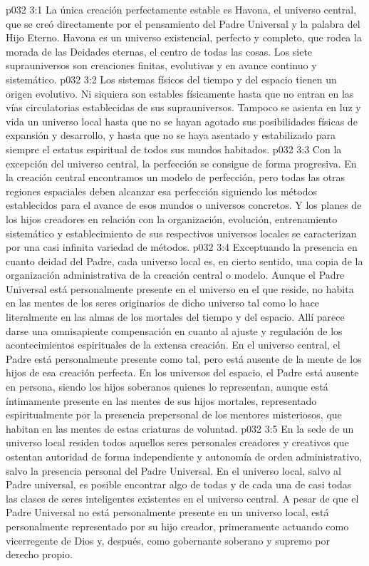 \vs p032 3:1 La única creación perfectamente estable es Havona, el universo central, que se creó directamente por el pensamiento del Padre Universal y la palabra del Hijo Eterno. Havona es un universo existencial, perfecto y completo, que rodea la morada de las Deidades eternas, el centro de todas las cosas. Los siete suprauniversos son creaciones finitas, evolutivas y en avance continuo y sistemático.
\vs p032 3:2 Los sistemas físicos del tiempo y del espacio tienen un origen evolutivo. Ni siquiera son estables físicamente hasta que no entran en las vías circulatorias establecidas de sus suprauniversos. Tampoco se asienta en luz y vida un universo local hasta que no se hayan agotado sus posibilidades físicas de expansión y desarrollo, y hasta que no se haya asentado y estabilizado para siempre el estatus espiritual de todos sus mundos habitados.
\vs p032 3:3 Con la excepción del universo central, la perfección se consigue de forma progresiva. En la creación central encontramos un modelo de perfección, pero todas las otras regiones espaciales deben alcanzar esa perfección siguiendo los métodos establecidos para el avance de esos mundos o universos concretos. Y los planes de los hijos creadores en relación con la organización, evolución, entrenamiento sistemático y establecimiento de sus respectivos universos locales se caracterizan por una casi infinita variedad de métodos.
\vs p032 3:4 \pc Exceptuando la presencia en cuanto deidad del Padre, cada universo local es, en cierto sentido, una copia de la organización administrativa de la creación central o modelo. Aunque el Padre Universal está personalmente presente en el universo en el que reside, no habita en las mentes de los seres originarios de dicho universo tal como lo hace literalmente en las almas de los mortales del tiempo y del espacio. Allí parece darse una omnisapiente compensación en cuanto al ajuste y regulación de los acontecimientos espirituales de la extensa creación. En el universo central, el Padre está personalmente presente como tal, pero está ausente de la mente de los hijos de esa creación perfecta. En los universos del espacio, el Padre está ausente en persona, siendo los hijos soberanos quienes lo representan, aunque está íntimamente presente en las mentes de sus hijos mortales, representado espiritualmente por la presencia prepersonal de los mentores misteriosos, que habitan en las mentes de estas criaturas de voluntad.
\vs p032 3:5 En la sede de un universo local residen todos aquellos seres personales creadores y creativos que ostentan autoridad de forma independiente y autonomía de orden administrativo, salvo la presencia personal del Padre Universal. En el universo local, salvo al Padre universal, es posible encontrar algo de todas y de cada una de casi todas las clases de seres inteligentes existentes en el universo central. A pesar de que el Padre Universal no está personalmente presente en un universo local, está personalmente representado por su hijo creador, primeramente actuando como vicerregente de Dios y, después, como gobernante soberano y supremo por derecho propio.
